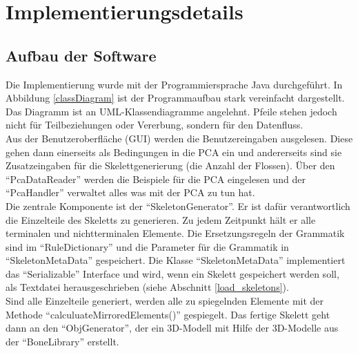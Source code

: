 \chapter{Implementierungsdetails}
\label{chapter:implementation_detail}


\section{Aufbau der Software}
\label{software_architecture}

Die Implementierung wurde mit der Programmiersprache Java durchgeführt. In Abbildung \ref{classDiagram} ist der Programmaufbau stark vereinfacht dargestellt. Das Diagramm ist an UML-Klassendiagramme angelehnt. Pfeile stehen jedoch nicht für Teilbeziehungen oder Vererbung, sondern für den Datenfluss.\\
Aus der Benutzeroberfläche (GUI) werden die Benutzereingaben ausgelesen. Diese gehen dann einerseits als Bedingungen in die PCA ein und andererseits sind sie Zusatzeingaben für die Skelettgenerierung (\zb die Anzahl der Flossen). 
Über den "`PcaDataReader"' werden die Beispiele für die PCA eingelesen und der "`PcaHandler"' verwaltet alles was mit der PCA zu tun hat.\\
Die zentrale Komponente ist der "`SkeletonGenerator"'. Er ist dafür verantwortlich die Einzelteile des Skeletts zu generieren. Zu jedem Zeitpunkt hält er alle terminalen und nichtterminalen Elemente. Die Ersetzungsregeln der Grammatik sind im "`RuleDictionary"' und die Parameter für die Grammatik in "`SkeletonMetaData"' gespeichert. Die Klasse "`SkeletonMetaData"' implementiert das "`Serializable"' Interface \cite{JavaSerialization} und wird, wenn ein Skelett gespeichert werden soll, als Textdatei herausgeschrieben (siehe Abschnitt \ref{load_skeletons}).\\
Sind alle Einzelteile generiert, werden alle zu spiegelnden Elemente mit der Methode "`calculuateMirroredElements()"' gespiegelt. Das fertige Skelett geht dann an den "`ObjGenerator"', der ein 3D-Modell mit Hilfe der 3D-Modelle aus der "`BoneLibrary"' erstellt.

